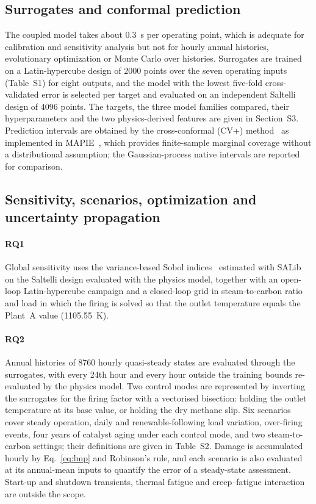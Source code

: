 \documentclass[final,3p,times]{elsarticle}
\begin{document}
\subsection{Surrogates and conformal prediction}
\label{sec:surrogate}

The coupled model takes about 0.3~s per operating point, which is adequate for calibration and sensitivity analysis but not for hourly annual histories, evolutionary optimization or Monte Carlo over histories. Surrogates are trained on a Latin-hypercube design of 2000 points over the seven operating inputs (Table~S1) for eight outputs, and the model with the lowest five-fold cross-validated error is selected per target and evaluated on an independent Saltelli design of 4096 points. The targets, the three model families compared, their hyperparameters and the two physics-derived features are given in Section~S3. Prediction intervals are obtained by the cross-conformal (CV+) method~\cite{barber2021} as implemented in MAPIE~\cite{mapie}, which provides finite-sample marginal coverage without a distributional assumption; the Gaussian-process native intervals are reported for comparison.

\subsection{Sensitivity, scenarios, optimization and uncertainty propagation}
\label{sec:campaigns}

\paragraph{RQ1} Global sensitivity uses the variance-based Sobol indices~\cite{saltelli2010} estimated with SALib~\cite{salib} on the Saltelli design evaluated with the physics model, together with an open-loop Latin-hypercube campaign and a closed-loop grid in steam-to-carbon ratio and load in which the firing is solved so that the outlet temperature equals the Plant~A value (1105.55~K).

\paragraph{RQ2} Annual histories of 8760 hourly quasi-steady states are evaluated through the surrogates, with every 24th hour and every hour outside the training bounds re-evaluated by the physics model. Two control modes are represented by inverting the surrogates for the firing factor with a vectorised bisection: holding the outlet temperature at its base value, or holding the dry methane slip. Six scenarios cover steady operation, daily and renewable-following load variation, over-firing events, four years of catalyst aging under each control mode, and two steam-to-carbon settings; their definitions are given in Table~S2. Damage is accumulated hourly by Eq.~\eqref{eq:lmp} and Robinson's rule, and each scenario is also evaluated at its annual-mean inputs to quantify the error of a steady-state assessment. Start-up and shutdown transients, thermal fatigue and creep--fatigue interaction are outside the scope.
\end{document}
